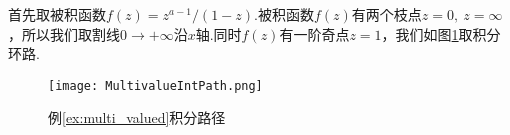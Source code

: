         \begin{solution}
            首先取被积函数$f(z)=z^{a-1}/(1-z)$.被积函数$f(z)$有两个枝点$z=0,\ z=\infty$，所以我们取割线$0\to +\infty$沿$x$轴.同时$f(z)$有一阶奇点$z=1$，我们如图\ref{fig:MultivalueIntPath}取积分环路.
        \end{solution}
        \begin{figure}
            \centering
            \texttt{[image: MultivalueIntPath.png]}
            \caption{例\ref{ex:multi_valued}积分路径}
            \label{fig:MultivalueIntPath}
        \end{figure}
        
